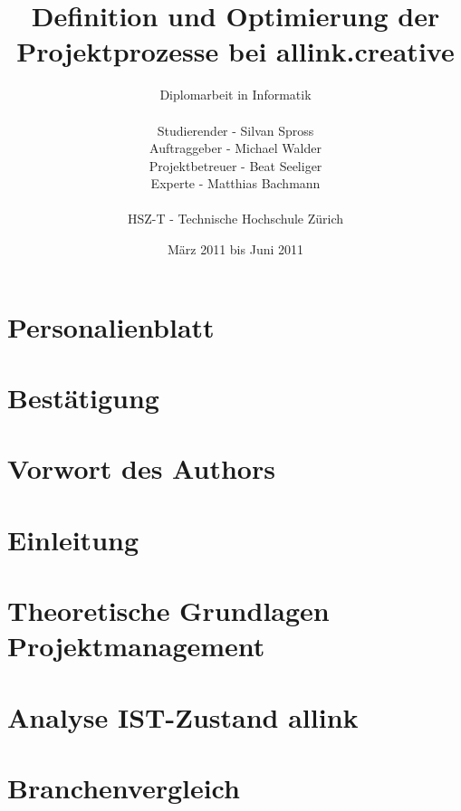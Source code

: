 \documentclass[
11pt, %
a4paper, %
BCOR10mm, %
DIV14, %
footsepline = false, %
headsepline, %
oneside, %
openright,
halfparskip, %
abstracton, %
listof=totocnumbered, %
bibliography=totocnumbered %
]{scrreprt}
\title{Definition und Optimierung der Projektprozesse bei allink.creative}
\author{Diplomarbeit in Informatik\\
    \\
    Studierender - Silvan Spross\\
	Auftraggeber - Michael Walder\\
    Projektbetreuer - Beat Seeliger\\
    Experte - Matthias Bachmann\\
	\\
	HSZ-T - Technische Hochschule Zürich}
\date{März 2011 bis Juni 2011}
\begin{document}
  \ifpdf
  \else
  \fi

  
  \maketitle

  

  
  \tableofcontents
  
  \chapter{Personalienblatt}
  
  
  \chapter{Bestätigung}
  
  
  \chapter{Vorwort des Authors}
  
  
  \chapter{Einleitung}
    
  
  \chapter{Theoretische Grundlagen Projektmanagement}\label{chap:theorie_teil}
  
  
  \chapter{Analyse IST-Zustand allink}\label{chap:analyse}
  
  
  \chapter{Branchenvergleich}\label{chap:branchenvergleich}
  
  
\end{document}
